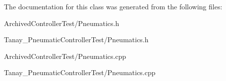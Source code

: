 The documentation for this class was generated from the following files\-:\begin{DoxyCompactItemize}
\item 
Archived\-Controller\-Test/Pneumatics.\-h\item 
Tanay\-\_\-\-Pneumatic\-Controller\-Test/Pneumatics.\-h\item 
Archived\-Controller\-Test/Pneumatics.\-cpp\item 
Tanay\-\_\-\-Pneumatic\-Controller\-Test/Pneumatics.\-cpp\end{DoxyCompactItemize}
